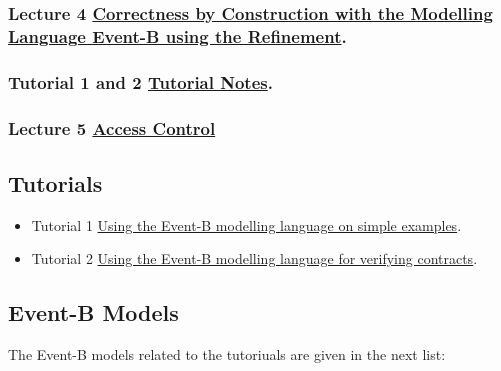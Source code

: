 \documentclass[ 12pt]{article}
\begin{document}
  

  \subsubsection{Lecture 4
    \href{http://mery54.github.io/teaching/mosos/lecturesnotes/mcfsi-maynooth-lect2.pdf}{Correctness by Construction with the  
      Modelling Language Event-B using the Refinement}.}
  \label{sec:lect-3-hrefhttp:m}

  \subsubsection{Tutorial  1 and 2
    \href{http://mery54.github.io/teaching/mosos/lecturesnotes/mcfsi-maynooth-tut.pdf}{Tutorial
      Notes}.}
\label{sec:tuthrefhttp:m}


\subsubsection{ Lecture 5 
    \href{http://mery54.github.io/teaching/mosos/lecturesnotes/mcfsi-maynooth-lect3.pdf}{Access 
      Control }
}



\subsection{Tutorials}

\begin{itemize}
 
  \item[]   Tutorial 1 
    \href{http://mery54.github.io/teaching/mosos/lecturesnotes/mastertutorial1.pdf}{Using 
      the Event-B modelling language on simple examples}.

   \item[]   Tutorial 2 
    \href{http://mery54.github.io/teaching/mosos/lecturesnotes/mastertutorial2.pdf}{Using 
      the Event-B modelling language  for verifying contracts}.



  \end{itemize}

    \subsection{Event-B Models}
\label{sec:event-b-models}


The Event-B models related to the tutoriuals are given in the next list: 
\end{document}

